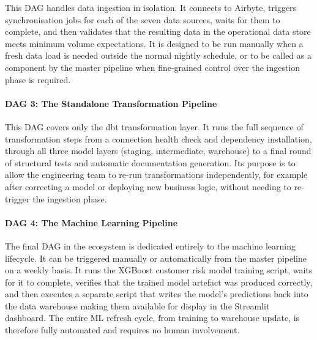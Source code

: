 This DAG handles data ingestion in isolation. It connects to Airbyte, triggers
synchronisation jobs for each of the seven data sources, waits for them to complete,
and then validates that the resulting data in the operational data store meets minimum
volume expectations. It is designed to be run manually when a fresh data load is
needed outside the normal nightly schedule, or to be called as a component by the
master pipeline when fine-grained control over the ingestion phase is required.

\paragraph{DAG 3: The Standalone Transformation Pipeline}

This DAG covers only the dbt transformation layer. It runs the full sequence of
transformation steps from a connection health check and dependency installation,
through all three model layers (staging, intermediate, warehouse) to a final round
of structural tests and automatic documentation generation. Its purpose is to allow
the engineering team to re-run transformations independently, for example after
correcting a model or deploying new business logic, without needing to re-trigger
the ingestion phase.

\paragraph{DAG 4: The Machine Learning Pipeline}

The final DAG in the ecosystem is dedicated entirely to the machine learning lifecycle.
It can be triggered manually or automatically from the master pipeline on a weekly
basis. It runs the XGBoost customer risk model training script, waits for it to
complete, verifies that the trained model artefact was produced correctly, and then
executes a separate script that writes the model's predictions back into the data
warehouse making them available for display in the Streamlit dashboard. The entire
ML refresh cycle, from training to warehouse update, is therefore fully automated
and requires no human involvement.

